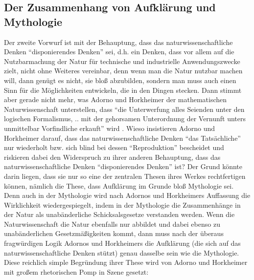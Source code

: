 \documentclass[12pt,a4paper,ngerman]{article}
\begin{document}
\subsection{Der Zusammenhang von Aufklärung und Mythologie}

Der zweite Vorwurf ist mit der Behauptung, dass das
naturwissenschaftliche Denken "`disponierendes Denken"' sei, d.h. ein
Denken, dass vor allem auf die Nutzbarmachung der Natur für technische
und industrielle Anwendungszwecke zielt, nicht ohne Weiteres
vereinbar, denn wenn man die Natur nutzbar machen will, dann genügt es
nicht, sie bloß abzubilden, sondern man muss auch einen Sinn für die
Möglichkeiten entwickeln, die in den Dingen stecken. Dann stimmt aber
gerade nicht mehr, was Adorno und Horkheimer der mathematischen
Naturwissenschaft unterstellen, dass "`die Unterwerfung alles Seienden
unter den logischen Formalismus, .. mit der gehorsamen Unterordnung
der Vernunft unters unmittelbar Vorfindliche erkauft"' wird
\cite[S. 33]{adorno-horkheimer:1947}. Wieso insistieren Adorno und
Horkheimer darauf, dass das naturwissenschaftliche Denken "`das
Tatsächliche"' nur wiederholt bzw. sich blind bei dessen
"`Reproduktion"' bescheidet und riskieren dabei den Widerspruch zu
ihrer anderen Behauptung, dass das naturwissenschaftliche Denken
"`disponierendes Denken"' ist? Der Grund könnte darin liegen, dass sie
nur so eine der zentralen Thesen ihres Werkes rechtfertigen können,
nämlich die These, dass Aufklärung im Grunde bloß Mythologie sei. Denn
auch in der Mythologie wird nach Adornos und Horkheimers Auffassung
die Wirklichkeit wiedergespiegelt, indem in der Mythologie die
Zusammenhänge in der Natur als unabänderliche Schicksalsgesetze
verstanden werden. Wenn die Naturwissenschaft die Natur ebenfalls nur
abbildet und dabei ebenso zu unabänderlichen Gesetzmäßigkeiten kommt,
dann muss nach der überaus fragwürdigen Logik Adornos und Horkheimers
die Aufklärung (die sich auf das naturwissenschaftliche Denken stützt)
genau dasselbe sein wie die Mythologie. Diese reichlich simple
Begründung ihrer These wird von Adorno und Horkheimer mit großem
rhetorischen Pomp in Szene gesetzt:
\end{document}
